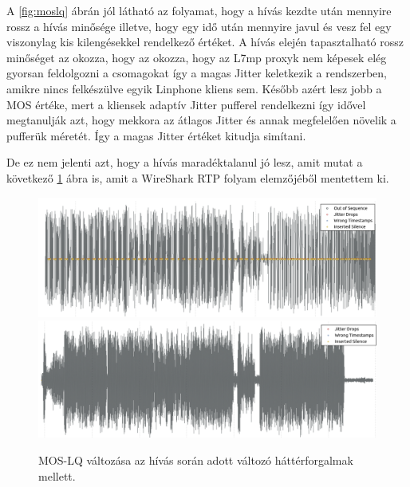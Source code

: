 
A \ref{fig:moslq} ábrán jól látható az folyamat, hogy a hívás kezdte után mennyire rossz a hívás minősége
illetve, hogy egy idő után mennyire javul és vesz fel egy viszonylag kis kilengésekkel rendelkező értéket. 
A hívás elején tapasztalható rossz minőséget az okozza, hogy az okozza, hogy az L7mp proxyk nem képesek
elég gyorsan feldolgozni a csomagokat így a magas Jitter keletkezik a rendszerben, amikre nincs
felkészülve egyik Linphone kliens sem. Később azért lesz jobb a MOS értéke, mert a kliensek adaptív
Jitter pufferel rendelkezni így idővel megtanulják azt, hogy mekkora az átlagos Jitter és annak megfelelően 
növelik a pufferük méretét. Így a magas Jitter értéket kitudja simítani.

De ez nem jelenti azt, hogy a hívás maradéktalanul jó lesz, amit mutat a következő \ref{fig:voiceComp}
ábra is, amit a WireShark RTP folyam elemzőjéből mentettem ki. 

\begin{figure}[!ht]
	\centering
	\includegraphics[width=1\textwidth, keepaspectratio]{figures/calls60.png}
	\includegraphics[width=1\textwidth, keepaspectratio]{figures/calls20.png}
	\caption{MOS-LQ változása az hívás során adott változó háttérforgalmak mellett.}
	\label{fig:voiceComp}
\end{figure}

